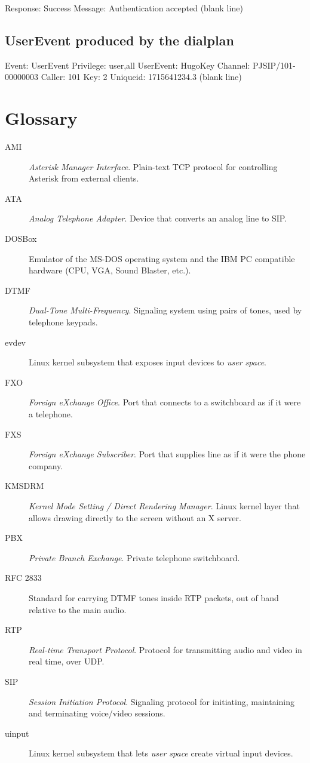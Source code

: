 \begin{plaincode}
Response: Success
Message: Authentication accepted
(blank line)
\end{plaincode}

\subsection{UserEvent produced by the dialplan}

\begin{plaincode}
Event: UserEvent
Privilege: user,all
UserEvent: HugoKey
Channel: PJSIP/101-00000003
Caller: 101
Key: 2
Uniqueid: 1715641234.3
(blank line)
\end{plaincode}

\section{Glossary}

\begin{description}
  \item[AMI] \emph{Asterisk Manager Interface}. Plain-text TCP protocol for controlling Asterisk from external clients.
  \item[ATA] \emph{Analog Telephone Adapter}. Device that converts an analog line to SIP.
  \item[DOSBox] Emulator of the MS-DOS operating system and the IBM PC compatible hardware (CPU, VGA, Sound Blaster, etc.).
  \item[DTMF] \emph{Dual-Tone Multi-Frequency}. Signaling system using pairs of tones, used by telephone keypads.
  \item[evdev] Linux kernel subsystem that exposes input devices to \emph{user space}.
  \item[FXO] \emph{Foreign eXchange Office}. Port that connects to a switchboard as if it were a telephone.
  \item[FXS] \emph{Foreign eXchange Subscriber}. Port that supplies line as if it were the phone company.
  \item[KMSDRM] \emph{Kernel Mode Setting / Direct Rendering Manager}. Linux kernel layer that allows drawing directly to the screen without an X server.
  \item[PBX] \emph{Private Branch Exchange}. Private telephone switchboard.
  \item[RFC 2833] Standard for carrying DTMF tones inside RTP packets, out of band relative to the main audio.
  \item[RTP] \emph{Real-time Transport Protocol}. Protocol for transmitting audio and video in real time, over UDP.
  \item[SIP] \emph{Session Initiation Protocol}. Signaling protocol for initiating, maintaining and terminating voice/video sessions.
  \item[uinput] Linux kernel subsystem that lets \emph{user space} create virtual input devices.
\end{description}

